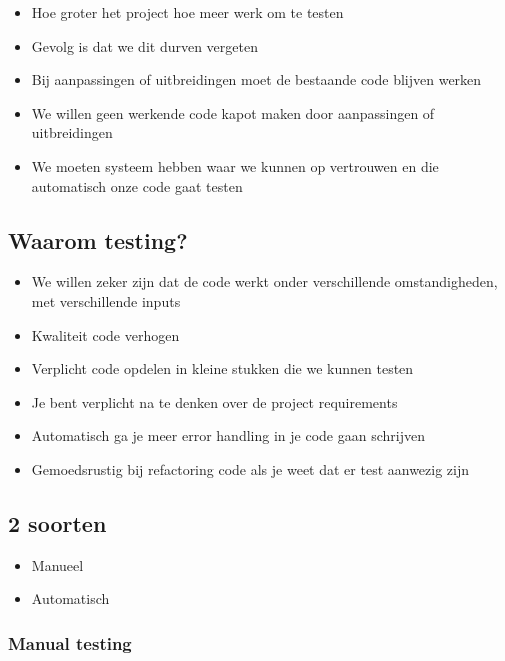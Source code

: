 \documentclass{article}
\begin{document}
\begin{itemize}
    \item Hoe groter het project hoe meer werk om te testen
    \item Gevolg is dat we dit durven vergeten
    \item Bij aanpassingen of uitbreidingen moet de bestaande code blijven werken
    \item We willen geen werkende code kapot maken door aanpassingen of uitbreidingen
    \item We moeten systeem hebben waar we kunnen op vertrouwen en die automatisch onze code gaat testen
\end{itemize}

\subsection{Waarom testing?}

\begin{itemize}
    \item We willen zeker zijn dat de code werkt onder verschillende omstandigheden, met verschillende inputs
    \item Kwaliteit code verhogen
    \item Verplicht code opdelen in kleine stukken die we kunnen testen
    \item Je bent verplicht na te denken over de project requirements
    \item Automatisch ga je meer error handling in je code gaan schrijven
    \item Gemoedsrustig bij refactoring code als je weet dat er test aanwezig zijn
\end{itemize}

\subsection{2 soorten}

\begin{itemize}
    \item Manueel
    \item Automatisch
\end{itemize}

\subsubsection{Manual testing}
\end{document}
